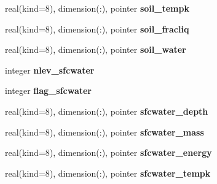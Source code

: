 \begin{DoxyCompactItemize}
\item 
\hypertarget{structrk4__coms_1_1rk4patchtype_a11809e434da4e13d3f84eeb151c559fb}{
real(kind=8), dimension(:), pointer {\bfseries soil\_\-tempk}}
\label{structrk4__coms_1_1rk4patchtype_a11809e434da4e13d3f84eeb151c559fb}

\item 
\hypertarget{structrk4__coms_1_1rk4patchtype_acb538382d8184002b0161d7cbe2a8c0c}{
real(kind=8), dimension(:), pointer {\bfseries soil\_\-fracliq}}
\label{structrk4__coms_1_1rk4patchtype_acb538382d8184002b0161d7cbe2a8c0c}

\item 
\hypertarget{structrk4__coms_1_1rk4patchtype_a786f1f3e547457f6f9b4536ff98df1e3}{
real(kind=8), dimension(:), pointer {\bfseries soil\_\-water}}
\label{structrk4__coms_1_1rk4patchtype_a786f1f3e547457f6f9b4536ff98df1e3}

\item 
\hypertarget{structrk4__coms_1_1rk4patchtype_adc5144790cd2799dcfaa4e0db370780a}{
integer {\bfseries nlev\_\-sfcwater}}
\label{structrk4__coms_1_1rk4patchtype_adc5144790cd2799dcfaa4e0db370780a}

\item 
\hypertarget{structrk4__coms_1_1rk4patchtype_abdc62babe20bbe6f44149208d4c2b3f2}{
integer {\bfseries flag\_\-sfcwater}}
\label{structrk4__coms_1_1rk4patchtype_abdc62babe20bbe6f44149208d4c2b3f2}

\item 
\hypertarget{structrk4__coms_1_1rk4patchtype_a5126416528ba6826ee766b2d2ab63754}{
real(kind=8), dimension(:), pointer {\bfseries sfcwater\_\-depth}}
\label{structrk4__coms_1_1rk4patchtype_a5126416528ba6826ee766b2d2ab63754}

\item 
\hypertarget{structrk4__coms_1_1rk4patchtype_af32b3e69f3cc43fe0422a181e7d59851}{
real(kind=8), dimension(:), pointer {\bfseries sfcwater\_\-mass}}
\label{structrk4__coms_1_1rk4patchtype_af32b3e69f3cc43fe0422a181e7d59851}

\item 
\hypertarget{structrk4__coms_1_1rk4patchtype_a3f8388a7fe7bd2e753124bcc07f49a7f}{
real(kind=8), dimension(:), pointer {\bfseries sfcwater\_\-energy}}
\label{structrk4__coms_1_1rk4patchtype_a3f8388a7fe7bd2e753124bcc07f49a7f}

\item 
\hypertarget{structrk4__coms_1_1rk4patchtype_ac7e40d2efaee580785b4627d712897fe}{
real(kind=8), dimension(:), pointer {\bfseries sfcwater\_\-tempk}}
\label{structrk4__coms_1_1rk4patchtype_ac7e40d2efaee580785b4627d712897fe}


\end{DoxyCompactItemize}
